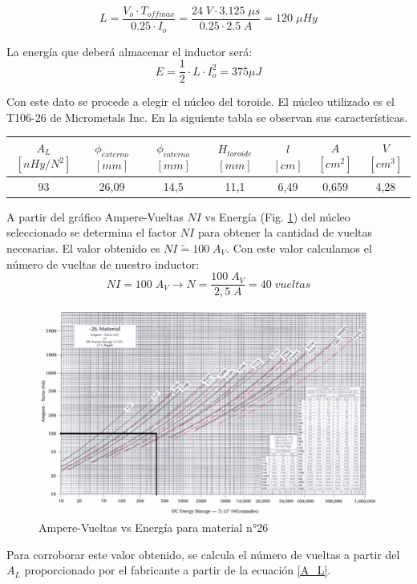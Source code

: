 \documentclass[11pt, a4paper]{article}
\begin{document}
\begin{equation}
L = \frac{V_o \cdot T_{offmax}}{0.25 \cdot I_o} = \frac{24 \; V \cdot 3.125 \; \mu s}{0.25 \cdot 2.5 \; A} = 120 \; \mu Hy
\label{L}
\end{equation}

La energía que deberá almacenar el inductor será:
\[ E = \frac{1}{2} \cdot L \cdot I_{o}^{2} = 375 \mu J \]

Con este dato se procede a elegir el núcleo del toroide. El núcleo utilizado es el T106-26 de Micrometals Inc. En la siguiente tabla se observan sus características.
\begin{center}
	\begin{tabular}[h]{||c|c|c|c|c|c|c||}
		\hline
		$A_L$ $[nHy/N^2]$ & $\phi_{externo}$ $[mm]$ & $\phi_{interno}$ $[mm]$ & $H_{toroide}$ $[mm]$ & $\mathit{l}$ $[cm]$ & $A$ $[cm^2]$ & $V$ $[cm^3]$ \\
		\hline
		93 & 26,09 & 14,5 & 11,1 & 6,49 & 0,659 & 4,28 \\
		\hline
	\end{tabular}
\end{center}

A partir del gráfico Ampere-Vueltas $NI$ vs Energía (Fig. \ref{NIvsE}) del núcleo seleccionado se determina el factor $NI$ para obtener la cantidad de vueltas necesarias. El valor obtenido es $NI \tilde{=} 100 \; A_V$. Con este valor calculamos el número de vueltas de nuestro inductor:
\[NI = 100 \; A_V \rightarrow N = \frac{100 \; A_V}{2,5 \; A} = 40 \; vueltas\]

\begin{figure}[h]
	\centering
	\includegraphics[width = 12 cm]{Imagenes/NIvsE}
	\caption{Ampere-Vueltas vs Energía para material n°26}
	\label{NIvsE}
\end{figure}

Para corroborar este valor obtenido, se calcula el número de vueltas a partir del $A_L$ proporcionado por el fabricante a partir de la ecuación \ref{A_L}.
\end{document}
